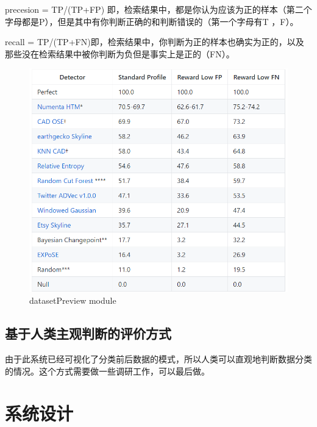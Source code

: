 \documentclass[UTF8]{ctexart}
\begin{document}
precesion = TP/(TP+FP) 即，检索结果中，都是你认为应该为正的样本（第二个字母都是P），但是其中有你判断正确的和判断错误的（第一个字母有T ，F）。

recall = TP/(TP+FN)即，检索结果中，你判断为正的样本也确实为正的，以及那些没在检索结果中被你判断为负但是事实上是正的（FN）。

\begin{figure}[ht]
\centering
\includegraphics[scale=0.5]{NAB-benchmark.png}
\caption{datasetPreview module}
\end{figure}

\subsection{基于人类主观判断的评价方式}
由于此系统已经可视化了分类前后数据的模式，所以人类可以直观地判断数据分类的情况。这个方式需要做一些调研工作，可以最后做。

\section{系统设计}
\end{document}
